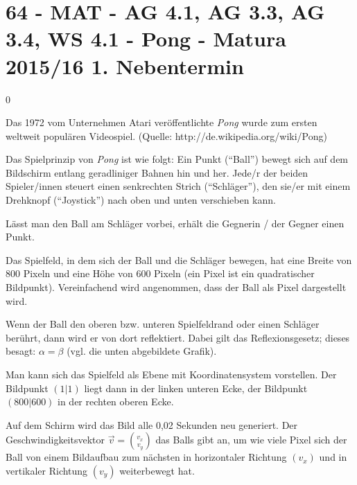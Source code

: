 \section{64 - MAT - AG 4.1, AG 3.3, AG 3.4, WS 4.1 - Pong - Matura 2015/16 1. Nebentermin}

\begin{langesbeispiel} \item[0] %
	
Das 1972 vom Unternehmen Atari veröffentlichte \textit{Pong} wurde zum ersten weltweit populären Videospiel. (Quelle: http://de.wikipedia.org/wiki/Pong)

Das Spielprinzip von \textit{Pong} ist wie folgt: Ein Punkt ("`Ball"') bewegt sich auf dem Bildschirm entlang geradliniger Bahnen hin und her. Jede/r der beiden Spieler/innen steuert einen senkrechten Strich ("`Schläger"'), den sie/er mit einem Drehknopf ("`Joystick"') nach oben und unten verschieben kann. 

Lässt man den Ball am Schläger vorbei, erhält die Gegnerin / der Gegner einen Punkt.

Das Spielfeld, in dem sich der Ball und die Schläger bewegen, hat eine Breite von 800 Pixeln und eine Höhe von 600 Pixeln (ein Pixel ist ein quadratischer Bildpunkt). Vereinfachend wird angenommen, dass der Ball als Pixel dargestellt wird. 

Wenn der Ball den oberen bzw. unteren Spielfeldrand oder einen Schläger berührt, dann wird er von dort reflektiert. Dabei gilt das Reflexionsgesetz; dieses besagt: $\alpha=\beta$ (vgl. die unten abgebildete Grafik).

Man kann sich das Spielfeld als Ebene mit Koordinatensystem vorstellen. Der Bildpunkt $(1|1)$ liegt dann in der linken unteren Ecke, der Bildpunkt $(800|600)$ in der rechten oberen Ecke.

Auf dem Schirm wird das Bild alle 0,02 Sekunden neu generiert. Der Geschwindigkeitsvektor $\vec{v}=\binom{v_x}{v_y}$ das Balls gibt an, um wie viele Pixel sich der Ball von einem Bildaufbau zum nächsten in horizontaler Richtung $\left(v_x\right)$ und in vertikaler Richtung $\left(v_y\right)$ weiterbewegt hat.


\end{langesbeispiel}
